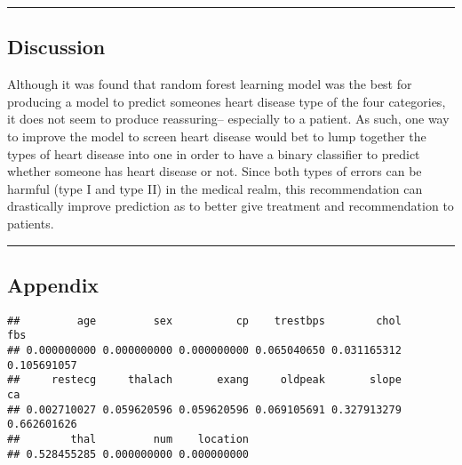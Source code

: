 \documentclass[
]{article}
\begin{document}
\begin{center}\rule{0.5\linewidth}{0.5pt}\end{center}

\hypertarget{discussion}{%
\subsection{Discussion}\label{discussion}}

Although it was found that random forest learning model was the best for
producing a model to predict someones heart disease type of the four
categories, it does not seem to produce reassuring-- especially to a
patient. As such, one way to improve the model to screen heart disease
would bet to lump together the types of heart disease into one in order
to have a binary classifier to predict whether someone has heart disease
or not. Since both types of errors can be harmful (type I and type II)
in the medical realm, this recommendation can drastically improve
prediction as to better give treatment and recommendation to patients.

\begin{center}\rule{0.5\linewidth}{0.5pt}\end{center}

\hypertarget{appendix}{%
\subsection{Appendix}\label{appendix}}

\begin{verbatim}
##         age         sex          cp    trestbps        chol         fbs 
## 0.000000000 0.000000000 0.000000000 0.065040650 0.031165312 0.105691057 
##     restecg     thalach       exang     oldpeak       slope          ca 
## 0.002710027 0.059620596 0.059620596 0.069105691 0.327913279 0.662601626 
##        thal         num    location 
## 0.528455285 0.000000000 0.000000000
\end{verbatim}
\end{document}
